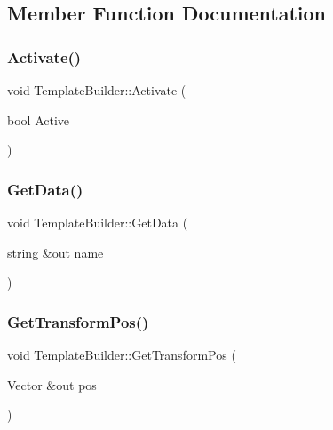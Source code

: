 \subsection{Member Function Documentation}
\hypertarget{class_template_builder_a5407173fd0e3aedacfbf50b5fe8ee619}{}\label{class_template_builder_a5407173fd0e3aedacfbf50b5fe8ee619} 
\subsubsection{\texorpdfstring{Activate()}{Activate()}}
{\footnotesize\ttfamily void Template\+Builder\+::\+Activate (\begin{DoxyParamCaption}\item[{bool}]{Active }\end{DoxyParamCaption})}

\hypertarget{class_template_builder_a9c05096ddb7f195343005cb82b722846}{}\label{class_template_builder_a9c05096ddb7f195343005cb82b722846} 
\subsubsection{\texorpdfstring{Get\+Data()}{GetData()}}
{\footnotesize\ttfamily void Template\+Builder\+::\+Get\+Data (\begin{DoxyParamCaption}\item[{string \&out}]{name }\end{DoxyParamCaption})}

\hypertarget{class_template_builder_ae9aa871d5cf4a5d330babdc58a481b9d}{}\label{class_template_builder_ae9aa871d5cf4a5d330babdc58a481b9d} 
\subsubsection{\texorpdfstring{Get\+Transform\+Pos()}{GetTransformPos()}}
{\footnotesize\ttfamily void Template\+Builder\+::\+Get\+Transform\+Pos (\begin{DoxyParamCaption}\item[{Vector \&out}]{pos }\end{DoxyParamCaption})}


